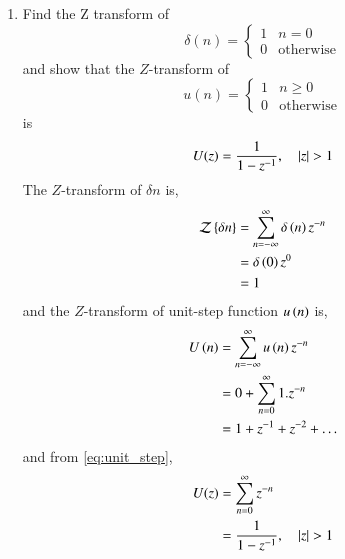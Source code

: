 \documentclass[journal,12pt,twocolumn]{IEEEtran}
\renewcommand\thesection{\arabic{section}}
\begin{document}
\begin{enumerate}[label=\thesection.\arabic*]
     \item Find the Z transform of
           \begin{equation}
                \delta(n)
                =
                \begin{cases}
                     1 & n = 0
                     \\
                     0 & \text{otherwise}
                \end{cases}
           \end{equation}
           and show that the $Z$-transform of
           \begin{equation}
                \label{eq:unit_step}
                u(n)
                =
                \begin{cases}
                     1 & n \ge 0
                     \\
                     0 & \text{otherwise}
                \end{cases}
           \end{equation}
           is
           \begin{equation}
                U(z) = \frac{1}{1-z^{-1}}, \quad \left\vert z\right\vert > 1
           \end{equation}
           \solution
           The $Z$-transform of $\delta{n}$ is,
           \begin{align}
                \mathcal{Z}\left\{\delta{n}\right\} & = \sum_{n=-\infty}^{\infty}\delta\left(n\right)z^{-n} \\
                                             & = \delta\left(0\right)z^{0}                           \\
                                             & = 1
           \end{align}
           and the $Z$-transform of unit-step function $u\left(n\right)$ is,
           \begin{align}
                U\left(n\right) & = \sum_{n=-\infty}^{\infty}u\left(n\right)z^{-n} \\
                          & = 0 + \sum_{n = 0}^{\infty}1.z^{-n}        \\
                          & = 1 + z^{-1} + z^{-2} + .\,.\,.
           \end{align}
           and from \eqref{eq:unit_step},
           \begin{align}
                U(z) & = \sum _{n= 0}^{\infty}z^{-n}
                \\
                     & =\frac{1}{1-z^{-1}}, \quad \left\vert z\right\vert > 1
           \end{align}

\end{enumerate}
\end{document}
